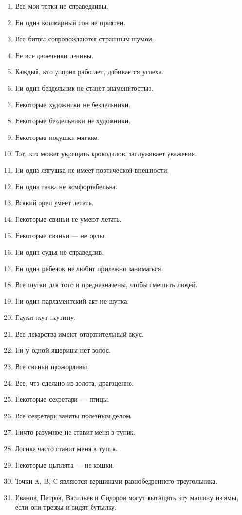 \documentclass[14pt]{extreport}
\begin{document}
\begin{enumerate}
  \item Все мои тетки не справедливы.
\item  Ни один кошмарный сон не приятен.
\item  Все битвы сопровождаются страшным шумом.
\item Не все двоечники ленивы.
\item  Каждый, кто упорно работает, добивается успеха.
\item  Ни один бездельник не станет знаменитостью.
\item  Некоторые художники не бездельники.
\item  Некоторые бездельники не художники.
\item  Некоторые подушки мягкие.
\item  Тот, кто может укрощать крокодилов, заслуживает уважения.
\item  Ни одна лягушка не имеет поэтической внешности.
\item  Ни одна тачка не комфортабельна.
\item  Всякий орел умеет летать.
\item  Некоторые свиньи не умеют летать.
\item  Некоторые свиньи --- не орлы.
\item  Ни один судья не справедлив.
\item  Ни один ребенок не любит прилежно заниматься.
\item  Все шутки для того и предназначены, чтобы смешить людей.
\item  Ни один парламентский акт не шутка.
\item  Пауки ткут паутину.
\item  Все лекарства имеют отвратительный вкус.
\item  Ни у одной ящерицы нет волос.
\item  Все свиньи прожорливы.
\item  Все, что сделано из золота, драгоценно.
\item  Некоторые секретари --- птицы.
\item  Все секретари заняты полезным делом.
\item  Ничто разумное не ставит меня в тупик.
\item  Логика часто ставит меня в тупик.
\item  Некоторые цыплята --- не кошки.
\item Точки A, B, C являются вершинами равнобедренного треугольника.
\item Иванов, Петров, Васильев и Сидоров могут вытащить эту машину из ямы, если они трезвы и видят бутылку.

\end{enumerate}
\end{document}
